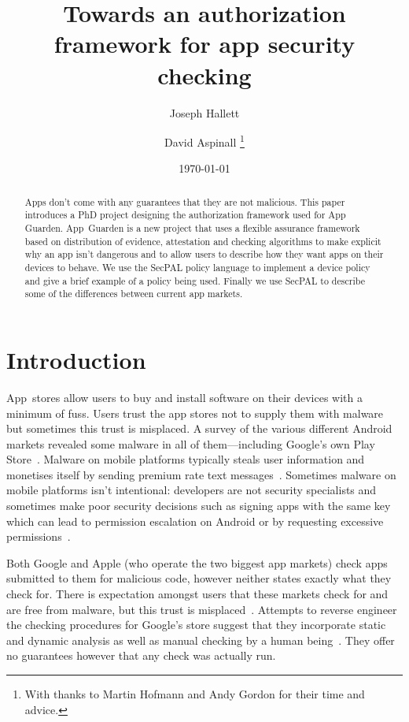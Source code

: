 \documentclass[]{llncs}
\title{Towards an authorization framework for app security checking}
\author{Joseph Hallett
  \and David Aspinall
  \thanks{With thanks to Martin Hofmann and Andy Gordon for their time and advice.}
}
\institute{University of Edinburgh}
\date{\today}
\begin{document}
\maketitle

\begin{abstract} 
  
  Apps don't come with any guarantees that they are not malicious.  This paper
  introduces a PhD project designing the authorization framework used for App
  Guarden. App~Guarden is a new project that uses a flexible assurance
  framework based on distribution of evidence, attestation and checking
  algorithms to make explicit why an app isn't dangerous and to allow users to
  describe how they want apps on their devices to behave.  We use the SecPAL
  policy language to implement a device policy and give a brief example of a
  policy being used. Finally we use SecPAL to describe some of the differences
  between current app markets. 

\end{abstract}

\section{Introduction}

App~stores allow users to buy and install software on their devices with a
minimum of fuss.  Users trust the app stores not to supply them with malware
but sometimes this trust is misplaced. A survey of the various different
Android markets revealed some malware in all of them---including Google's own
Play Store~\cite{Zhou:2012tb}.  Malware on mobile platforms typically steals
user information and monetises itself by sending premium rate text
messages~\cite{Felt:2011we}.  
Sometimes malware on mobile platforms isn't intentional: developers are not
security specialists and sometimes make poor security decisions such as signing
apps with the same key~\cite{Barrera:2012ib} which can lead to permission
escalation on Android or by requesting excessive
permissions~\cite{Felt:2011kj}.

Both Google and Apple (who operate the two biggest app markets) check apps
submitted to them for malicious code, however neither states exactly what they
check for. There is expectation amongst users that these markets check for and
are free from malware, but this trust is misplaced~\cite{Enck:2010ta}. Attempts
to reverse engineer the checking procedures for Google's store suggest that
they incorporate static and dynamic analysis as well as manual checking by a
human being~\cite{Oberheide:2012tl}. They offer no guarantees however that any
check was actually run.
\end{document}
